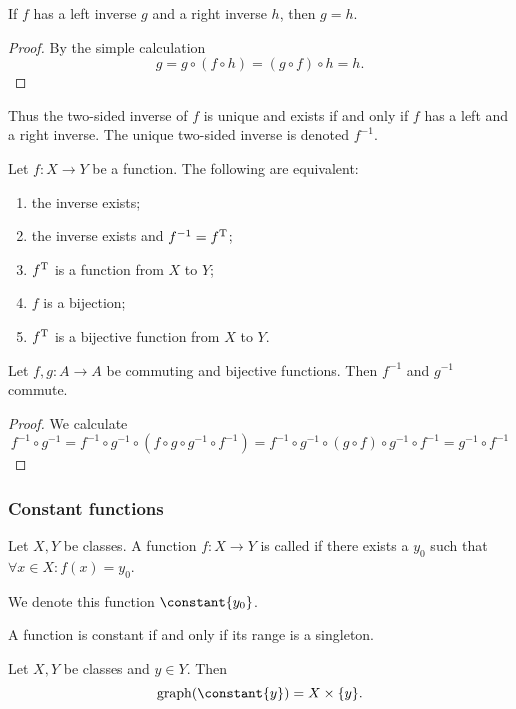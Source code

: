 \begin{lemma} \label{leftRightInverse}
If $f$ has a left inverse $g$ and a right inverse $h$, then $g=h$.
\end{lemma}
\begin{proof}
By the simple calculation
\[ g = g\circ (f\circ h) = (g\circ f) \circ h = h. \]
\end{proof}
Thus the two-sided inverse of $f$ is unique and exists \textup{if and only if} $f$ has a left and a right inverse. The unique two-sided inverse is denoted $f^{-1}$.

\begin{lemma}
Let $f:X\to Y$ be a function. The following are equivalent:
\begin{enumerate} 
\item the inverse exists;
\item the inverse exists and $f^{-1} = f^{\mathrm{T}}$;
\item $f^{\mathrm{T}}$ is a function from $X$ to $Y$;
\item $f$ is a bijection;
\item $f^{\mathrm{T}}$ is a bijective function from $X$ to $Y$.
\end{enumerate}
\end{lemma}

\begin{lemma} \label{commutationInverse}
Let $f, g:A\to A$ be commuting and bijective functions. Then $f^{-1}$ and $g^{-1}$ commute.
\end{lemma}
\begin{proof}
We calculate
\[ f^{-1}\circ g^{-1} = f^{-1}\circ g^{-1}\circ (f\circ g \circ g^{-1} \circ f^{-1}) = f^{-1}\circ g^{-1}\circ (g\circ f) \circ g^{-1} \circ f^{-1} = g^{-1} \circ f^{-1} \]
\end{proof}

\subsubsection{Constant functions}
\begin{definition}
Let $X,Y$ be classes. A function $f:X\to Y$ is called  if there exists a $y_0$ such that $\forall x\in X: f(x) = y_0$.

We denote this function $\constant{y_0}$.
\end{definition}

A function is constant if and only if its range is a singleton.

\begin{lemma}
Let $X,Y$ be classes and $y\in Y$. Then
\[ \graph(\constant{y}) = X\times \{y\}. \]
\end{lemma}

